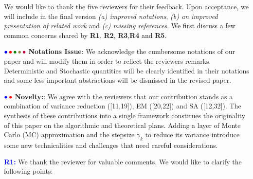 \documentclass{article}
\begin{document}
We would like to thank the five reviewers for their feedback. Upon acceptance, we will include in the final version \emph{{\sf (a)} improved notations}, \emph{{\sf (b)} an improved presentation of related work} and \emph{{\sf (c)} missing references}. 
We first discuss a few common concerns shared by \textbf{\color{blue}R1}, \textbf{\color{red} R2}, \textbf{\color{green!50!black}R3},\textbf{\color{yellow!50!black}R4} and \textbf{\color{purple}R5}.

${\color{blue}\bullet}\!~{\color{red}\bullet}\!~{\color{green!50!black}\bullet}\!~{\color{yellow!50!black}\bullet}\!~{\color{purple}\bullet}$ \textbf{Notations Issue}: 
We acknowledge the cumbersome notations of our paper and will modify them in order to reflect the reviewers remarks. 
Deterministic and Stochastic quantities will be clearly identified in their notations and some less important abstractions will be dismissed in the revised paper.


${\color{blue}\bullet}\!~{\color{red}\bullet}$ \textbf{Novelty:}: 
We agree with the reviewers that our contribution stands as a combination of variance reduction ([11,19]), EM ([20,22]) and SA ([12,32]). 
The synthesis of these contributions into a single framework constitues the originality of this paper on the algorithmic and theoretical plans.
Adding a layer of Monte Carlo (MC) approximation and the stepsize $\gamma_k$ to reduce its variance introduce some new technicalities and challenges that need careful considerations.\vspace{-0.05in}





\textbf{\textcolor{blue}{R1:}} We thank the reviewer for valuable comments. We would like to clarify the following points:\vspace{-0.05in}

\end{document}
